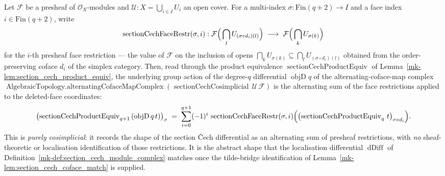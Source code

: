 \begin{lemma}
  \label{mk-lem:section_cech_objd_apply}

  Let \(\mathcal{F}\) be a presheaf of \(\mathcal{O}_X\)-modules and
  \(\mathcal{U} : X = \bigcup_{i \in I} U_i\) an open cover. For a multi-index
  \(\sigma : \mathrm{Fin}(q+2) \to I\) and a face index
  \(i \in \mathrm{Fin}(q+2)\), write
  \[
    \operatorname{sectionCechFaceRestr}(\sigma, i) :
      \mathcal{F}\Bigl(\,\bigcap_{l} U_{(\sigma \circ d_i)(l)}\Bigr)
      \;\longrightarrow\;
      \mathcal{F}\Bigl(\,\bigcap_{k} U_{\sigma(k)}\Bigr)
  \]
  for the \(i\)-th presheaf face restriction --- the value of \(\mathcal{F}\) on the
  inclusion of opens
  \(\bigcap_{k} U_{\sigma(k)} \subseteq \bigcap_{l} U_{(\sigma \circ d_i)(l)}\)
  obtained from the order-preserving coface \(d_i\) of the simplex category. Then,
  read through the product equivalence
  \(\operatorname{sectionCechProductEquiv}\) of
  Lemma~\ref{mk-lem:section_cech_product_equiv}, the underlying group action of the
  degree-\(q\) differential
  \(\operatorname{objD} q\) of the alternating-coface-map complex
  \(\operatorname{AlgebraicTopology.alternatingCofaceMapComplex}
  (\operatorname{sectionCechCosimplicial}\,\mathcal{U}\,\mathcal{F})\) is the alternating
  sum of the face restrictions applied to the deleted-face coordinates:
  \[
    \bigl(\operatorname{sectionCechProductEquiv}_{q+1}\,(\operatorname{objD} q\, t)\bigr)_\sigma
      \;=\;
      \sum_{i = 0}^{q+1} (-1)^i \,
        \operatorname{sectionCechFaceRestr}(\sigma, i)
          \Bigl(\bigl(\operatorname{sectionCechProductEquiv}_{q}\, t\bigr)_{\sigma \circ d_i}\Bigr).
  \]
  This is \emph{purely cosimplicial}: it records the shape of the section {\v C}ech
  differential as an alternating sum of presheaf restrictions, with \emph{no}
  sheaf-theoretic or localisation identification of those restrictions. It is the
  abstract shape that the localisation differential \(\operatorname{dDiff}\) of
  Definition~\ref{mk-def:section_cech_module_complex} matches once the tilde-bridge
  identification of Lemma~\ref{mk-lem:section_cech_coface_match} is supplied.
\end{lemma}

